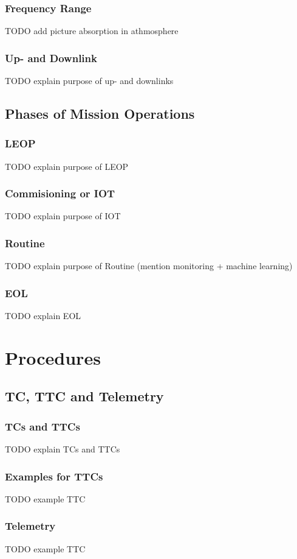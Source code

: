 \documentclass[12pt,utf8,notheorems,compress]{beamer}
\begin{document}
\begin{frame}
  \frametitle{Frequency Range}
  \pause
  TODO add picture absorption in athmosphere
\end{frame}

\begin{frame}
  \frametitle{Up- and Downlink}
  \pause
  TODO explain purpose of up- and downlinks
\end{frame}

\subsection{Phases of Mission Operations}

\begin{frame}
  \frametitle{LEOP}
  \pause
  TODO explain purpose of LEOP
\end{frame}

\begin{frame}
  \frametitle{Commisioning or IOT}
  \pause
  TODO explain purpose of IOT
\end{frame}

\begin{frame}
  \frametitle{Routine}
  \pause
  TODO explain purpose of Routine (mention monitoring + machine learning)
\end{frame}

\begin{frame}
  \frametitle{EOL}
  \pause
  TODO explain EOL
\end{frame}

\section{Procedures}

\subsection{TC, TTC and Telemetry}

\begin{frame}
  \frametitle{TCs and TTCs}
  \pause
  TODO explain TCs and TTCs
\end{frame}

\begin{frame}
  \frametitle{Examples for TTCs}
  \pause
  TODO example TTC
\end{frame}

\begin{frame}
  \frametitle{Telemetry}
  \pause
  TODO example TTC
\end{frame}
\end{document}
